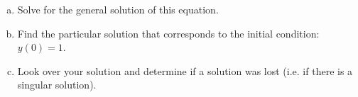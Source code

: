\documentclass[12pt]{amsart}
\numberwithin{equation}{section}
\begin{document}
\begin{enumerate}[(a)]
\item  Solve for the general solution of this equation. \\

\vspace{9.5cm}

\item  Find the particular solution that corresponds to the initial condition: $y(0)=1$. \\

\vspace{5.1cm}

\item Look over your solution and determine if a solution was lost (i.e. if there is a singular solution). \\

\vspace{4.1cm}

\end{enumerate}
\end{document}
